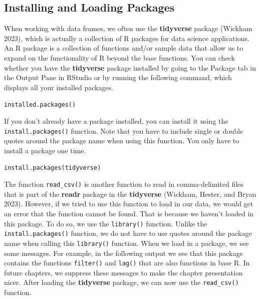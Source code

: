 \documentclass[
  letterpaper,
]{latex/krantz}
\begin{document}
\subsection{Installing and Loading
Packages}\label{installing-and-loading-packages}

When working with data frames, we often use the \textbf{tidyverse}
package (Wickham 2023), which is actually a
collection of R packages for data science applications. An R package
 is a collection of functions and/or sample data that
allow us to expand on the functionality of R beyond the base functions.
You can check whether you have the \textbf{tidyverse} package installed
by going to the Package tab in the Output Pane in RStudio or by running
the following command, which displays all your installed packages.

\texttt{installed.packages()}

If you don't already have a package installed, you can install it using
the \texttt{install.packages()}
function.
Note that you have to include single or double quotes around the package
name when using this function. You only have to install a package one
time.

\texttt{install.packages(\textquotesingle{}tidyverse\textquotesingle{})}

The function
\texttt{read\_csv()}
is another function to read in comma-delimited files that is part of the
\textbf{readr} package in the \textbf{tidyverse}
(Wickham, Hester, and Bryan 2023). However, if we tried to use this
function to load in our data, we would get an error that the function
cannot be found. That is because we haven't loaded in this package. To
do so, we use the
\texttt{library()}
function. Unlike the \texttt{install.packages()} function, we do not
have to use quotes around the package name when calling this
\texttt{library()} function. When we load in a package, we see some
messages. For example, in the following output we see that this package
contains the functions \texttt{filter()} and \texttt{lag()} that are
also functions in base R. In future chapters, we suppress these messages
to make the chapter presentation nicer. After loading the
\textbf{tidyverse} package, we can now use the \texttt{read\_csv()}
function.
\end{document}
